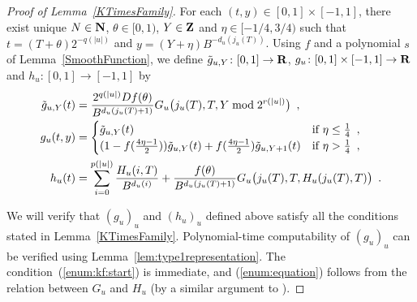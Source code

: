 \begin{proof}[Proof of Lemma~\ref{KTimesFamily}]
For each $(t, y) \in [0,1] \times [-1, 1]$,
there exist unique $N \in \mathbf N$, $\theta \in [0,1)$, $Y \in \mathbf Z$ and $\eta \in [-1/4, 3/4)$
such that $t = (T + \theta)2^{-q(|u|)}$ and $y = (Y + \eta)B^{-d_u(j_u(T))}$.
Using $f$ and a polynomial $s$ of Lemma~\ref{SmoothFunction},
we define 
$\tilde g_{u,Y} \colon [0,1] \to \mathbf R$,
$
g _u \colon [0, 1] \times [-1, 1] \to \mathbf R
$ and $
h _u \colon [0, 1] \to [-1, 1]
$ by
  \begin{align}
    \label{eq:delta}
   \tilde g_{u, Y} (t) &= \frac{2^{q(|u|)} D f(\theta)}{B^{d_u(j_u(T)+1)}} 
   G_u \bigl( j_u(T), T, Y \bmod 2^{r(|u|)} \bigr) \enspace ,
   \\
  \label{eq:gu}
  g_u(t,y) 
  &= \begin{cases}
     \tilde g_{u, Y}(t)
     & \text{if } \eta \le \frac{1}{4} \enspace , 
     \\
     ( 1-f ( \frac{4\eta-1}{2})) \tilde g_{u, Y}(t)
     + f ( \frac{4\eta-1}{2}) \tilde g_{u,Y+1}(t)
     & \text{if } \eta > \frac{1}{4} \enspace ,
    \end{cases}
   \\
  h_u(t) 
   &= \sum^{p(|u|)}_{i=0} \frac{H_u(i, T)}{B^{d_u(i)}}  
  + \frac{f(\theta)}{B^{d_u(j_u(T)+1)}} G_u \bigl( j_u(T), T, H_u(j_u(T), T) \bigr)  \enspace .
  \label{eq:hu}
  \end{align}

We will verify that $(g_u)_u$ and $(h_u)_u$ defined above satisfy all the conditions stated in Lemma~\ref{KTimesFamily}.
Polynomial-time computability of $(g_u)_u$ can be verified using Lemma~\ref{lem:type1representation}.
The condition~(\ref{enum:kf:start}) is immediate, 
and (\ref{enum:equation}) follows from the relation between $G _u$ and $H _u$ 
(by a similar argument to \cite[Lemma 4.1]{kawamura2010lipschitz}).


\end{proof}
